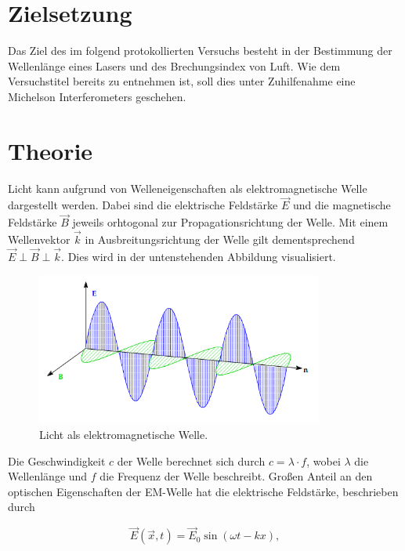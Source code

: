 



\section{Zielsetzung}
\label{Zielsetzung}

\noindent Das Ziel des im folgend protokollierten Versuchs besteht in der Bestimmung der Wellenlänge eines Lasers und des 
Brechungsindex von Luft. Wie dem Versuchstitel bereits zu entnehmen ist, soll dies unter Zuhilfenahme eine Michelson 
Interferometers geschehen.

\section{Theorie}
\label{sec:Theorie}

Licht kann aufgrund von Welleneigenschaften als elektromagnetische Welle dargestellt werden. Dabei sind die elektrische 
Feldstärke $\vec{E}$ und die magnetische Feldstärke $\vec{B}$ jeweils orhtogonal zur Propagationsrichtung der Welle. Mit einem 
Wellenvektor $\vec{k}$ in Ausbreitungsrichtung der Welle gilt dementsprechend $\vec{E} \perp \vec{B} \perp \vec{k}$. Dies wird in 
der untenstehenden Abbildung visualisiert.

\begin{figure}
    \centering
    \includegraphics[height=5cm]{EM_Welle.png}
    \caption{Licht als elektromagnetische Welle\cite{Versuchsanleitung_v401}.}
    \label{fig:EMWelle}
\end{figure}

\noindent Die Geschwindigkeit $c$ der Welle berechnet sich durch $c = \lambda\cdot{}f$, wobei $\lambda$ die Wellenlänge und $f$ die Frequenz 
der Welle beschreibt. Großen Anteil an den optischen Eigenschaften der EM-Welle hat die elektrische Feldstärke, beschrieben durch 

\begin{equation*}
    \vec{E}\left(\vec{x},t\right) = \vec{E}_0\sin\left(\omega{}t - kx\right),
\end{equation*}

